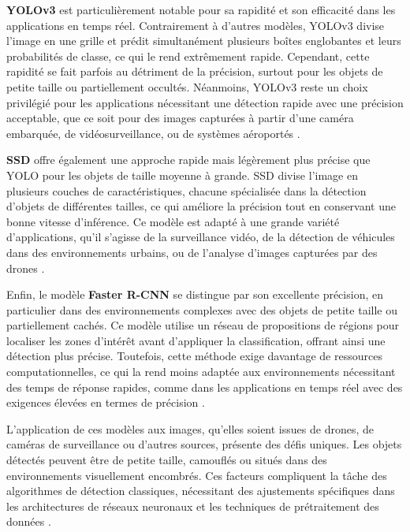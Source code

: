 \textbf{YOLOv3} \cite{redmon2016yolo} est particulièrement notable pour sa rapidité et son efficacité dans les applications en temps réel. Contrairement à d'autres modèles, YOLOv3 divise l'image en une grille et prédit simultanément plusieurs boîtes englobantes et leurs probabilités de classe, ce qui le rend extrêmement rapide. Cependant, cette rapidité se fait parfois au détriment de la précision, surtout pour les objets de petite taille ou partiellement occultés. Néanmoins, YOLOv3 reste un choix privilégié pour les applications nécessitant une détection rapide avec une précision acceptable, que ce soit pour des images capturées à partir d'une caméra embarquée, de vidéosurveillance, ou de systèmes aéroportés \cite{gupta2021}.

\textbf{SSD} \cite{liu2016ssd} offre également une approche rapide mais légèrement plus précise que YOLO pour les objets de taille moyenne à grande. SSD divise l'image en plusieurs couches de caractéristiques, chacune spécialisée dans la détection d'objets de différentes tailles, ce qui améliore la précision tout en conservant une bonne vitesse d'inférence. Ce modèle est adapté à une grande variété d'applications, qu'il s'agisse de la surveillance vidéo, de la détection de véhicules dans des environnements urbains, ou de l'analyse d'images capturées par des drones \cite{kamran2020}.

Enfin, le modèle \textbf{Faster R-CNN} \cite{girshick2016rcnn} se distingue par son excellente précision, en particulier dans des environnements complexes avec des objets de petite taille ou partiellement cachés. Ce modèle utilise un réseau de propositions de régions pour localiser les zones d'intérêt avant d'appliquer la classification, offrant ainsi une détection plus précise. Toutefois, cette méthode exige davantage de ressources computationnelles, ce qui la rend moins adaptée aux environnements nécessitant des temps de réponse rapides, comme dans les applications en temps réel avec des exigences élevées en termes de précision \cite{kamran2020}.

L'application de ces modèles aux images, qu'elles soient issues de drones, de caméras de surveillance ou d'autres sources, présente des défis uniques. Les objets détectés peuvent être de petite taille, camouflés ou situés dans des environnements visuellement encombrés. Ces facteurs compliquent la tâche des algorithmes de détection classiques, nécessitant des ajustements spécifiques dans les architectures de réseaux neuronaux et les techniques de prétraitement des données \cite{gupta2021}.

